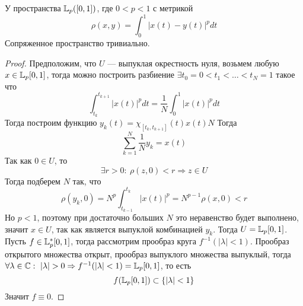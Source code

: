 \begin{example}
	У пространства $\mathbb{L}_p([0,1])$, где $0 < p < 1$ с метрикой 
	$$
	\rho(x,y) = \int_{0}^1|x(t) - y(t)|^pdt 
	$$
	Сопряженное пространство тривиально.
\end{example}
\begin{proof}
	Предположим, что $U$ --- выпуклая окрестность нуля, возьмем любую $x \in \mathbb{L}_p[0,1]$, тогда можно построить разбиение $\exists t_0 = 0 < t_1 < \dots < t_N = 1$ такое что 
	$$
	\int_{t_k}^{t_{k+1}}|x(t)|^p dt = \frac{1}{N}\int_{0}^1 |x(t)|^pdt
	$$
	Тогда построим функцию $y_k(t) = \chi_{[t_k, t_{k+1}]}(t)x(t)N$
	Тогда 
	$$
	\sum_{k=1}^{N}\frac{1}{N}y_k = x(t)
	$$ 
	Так как $0 \in U$, то $$\exists r > 0: \ \rho(z,0) < r \Rightarrow z \in U$$
	Тогда подберем $N$ так, что 
	$$
	\rho(y_k,0) = N^p\int_{t_{k-1}}^{t_k} |x(t)|^p = N^{p-1}\rho(x,0) < r
	$$
	Но $p<1$, поэтому при достаточно больших $N$ это неравенство будет выполнено, значит $x \in U$, так как является выпуклой комбинацией $y_k$. Тогда $U = \mathbb{L}_p[0,1]$. Пусть $f \in \mathbb{L}_p^*[0,1]$, тогда рассмотрим прообраз круга 
	$
	f^{-1}(|\lambda| < 1 ) 
	$. Прообраз открытого множества открыт, прообраз выпуклого множества выпуклый, тогда $\forall \lambda \in \mathbb{C}: \  |\lambda| > 0 \Rightarrow f^{-1}(|\lambda| < 1 )  = \mathbb{L}_p[0,1]$, то есть 
	$$
	f(\mathbb{L}_p[0,1]) \subset \{|\lambda| < 1\}
	$$ 
	Значит $f \equiv 0$.
\end{proof}